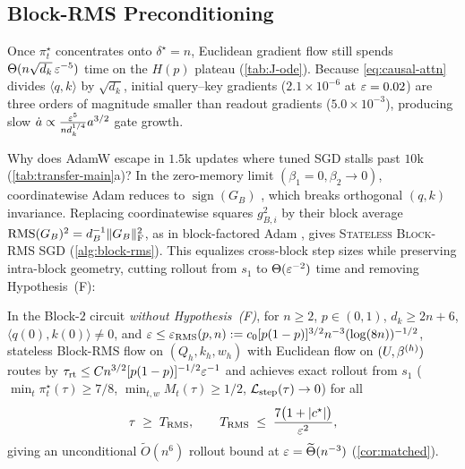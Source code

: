 \subsection{Block-RMS Preconditioning}
\label{sec:saddle-escape}

Once $\pi_t^\star$ concentrates onto $\delta^\star = n$, Euclidean gradient flow still spends $\Theta(n\sqrt{d_k}\,\varepsilon^{-5})$ time on the $H(p)$ plateau (\cref{tab:J-ode}). Because \cref{eq:causal-attn} divides $\langle q, k\rangle$ by $\sqrt{d_k}$, initial query--key gradients ($2.1\times 10^{-6}$ at $\varepsilon = 0.02$) are three orders of magnitude smaller than readout gradients ($5.0\times 10^{-3}$), producing slow $\dot a \propto \frac{\varepsilon^5}{n d_k^{1/4}} a^{3/2}$ gate growth.

Why does AdamW escape in $1.5$k updates where tuned SGD stalls past $10$k (\cref{tab:transfer-main}a)? In the zero-memory limit $(\beta_1 = 0, \beta_2 \to 0)$, coordinatewise Adam reduces to $\operatorname{sign}(G_B)$ \citep{bernstein2018signsgd}, which breaks orthogonal $(q,k)$ invariance. Replacing coordinatewise squares $g_{B,i}^2$ by their block average $\mathrm{RMS}(G_B)^2 = d_B^{-1}\|G_B\|_{\mathrm{F}}^2$, as in block-factored Adam \citep{zhang2024adammini}, gives \textsc{Stateless Block-RMS SGD} (\cref{alg:block-rms}). This equalizes cross-block step sizes while preserving intra-block geometry, cutting rollout from $s_1$ to $\Theta(\varepsilon^{-2})$ time and removing Hypothesis~(F):

\begin{theorem}
\label{thm:block-rms}
In the Block-$2$ circuit \emph{without Hypothesis~(F)}, for $n \ge 2$, $p \in (0,1)$, $d_k \ge 2n + 6$, $\langle q(0), k(0)\rangle \ne 0$, and $\varepsilon \le \varepsilon_{\mathrm{RMS}}(p, n) := c_0[p(1-p)]^{3/2}n^{-3}(\log(8n))^{-1/2}$, stateless Block-RMS flow on $(Q_h, k_h, w_h)$ with Euclidean flow on $(U, \beta^{(h)})$ routes by $\tau_{\mathrm{rt}} \le C n^{3/2}[p(1-p)]^{-1/2}\varepsilon^{-1}$ and achieves exact rollout from $s_1$ ($\min_t\pi_t^\star(\tau) \ge 7/8$, $\min_{t,w} M_t(\tau) \ge 1/2$, $\mathcal L_{\mathrm{step}}(\tau) \to 0$) for all
\begin{equation}
  \tau \;\ge\; T_{\mathrm{RMS}}, \qquad T_{\mathrm{RMS}} \;\le\; \frac{7\bigl(1 + \lvert c^\star\rvert\bigr)}{\varepsilon^2},
  \label{eq:rms-time}
\end{equation}
giving an unconditional $\widetilde O(n^6)$ rollout bound at $\varepsilon = \widetilde\Theta(n^{-3})$ (\cref{cor:matched}).
\end{theorem}

